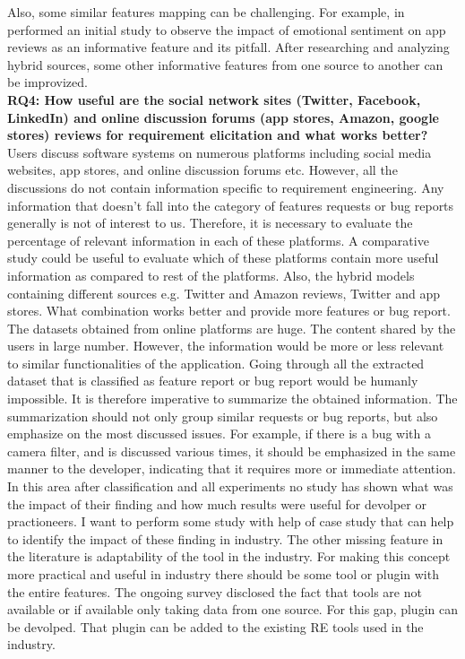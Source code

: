 	Also, some similar features mapping can be challenging. For example, in \cite{Martens:2017} performed an initial study to observe the impact of emotional sentiment on app reviews as an informative feature and its pitfall. After researching and analyzing hybrid sources, some other informative features from one source to another can be improvized.\\

\textbf{RQ4: How useful are the social network sites (Twitter, Facebook, LinkedIn) and online
discussion forums (app stores, Amazon, google stores) reviews for requirement elicitation
and what works better?}\\
Users discuss software systems on numerous platforms including social media websites,
app stores, and online discussion forums etc. However, all the discussions do not contain
information specific to requirement engineering. Any information that doesn’t fall into the
category of features requests or bug reports generally is not of interest to us. Therefore, it is
necessary to evaluate the percentage of relevant information in each of these platforms. A
comparative study could be useful to evaluate which of these platforms contain more useful
information as compared to rest of the platforms. Also, the hybrid models containing different
sources e.g. Twitter and Amazon reviews, Twitter and app stores. What combination works better
and provide more features or bug report.\\

	The datasets obtained from online platforms are huge. The content shared by the users in large number. However, the information would be more or less relevant to similar
functionalities of the application. Going through all the extracted dataset that is classified as
feature report or bug report would be humanly impossible. It is therefore imperative to
summarize the obtained information. The summarization should not only group similar requests
or bug reports, but also emphasize on the most discussed issues. For example, if there is a bug
with a camera filter, and is discussed various times, it should be emphasized in the same manner
to the developer, indicating that it requires more or immediate attention.\\

	In this area after classification and all experiments no study has shown what was the impact 
of their finding and how much results were useful for devolper or practioneers. I want to perform some study with help of  case study that can help to identify the impact
 of these finding in industry. The other missing feature in the literature is adaptability of the tool in the industry. For making
this concept more practical and useful in industry there should be some tool or plugin with
the entire features. The ongoing survey disclosed the fact that tools are not available or if available only
taking data from one source. For this gap, plugin can be devolped. That plugin can be added
to the existing RE tools used in the industry.
